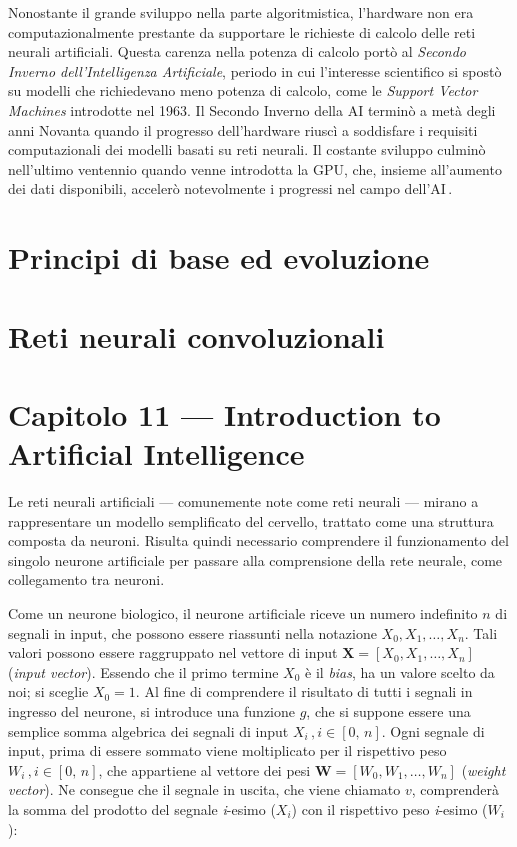 Nonostante il grande sviluppo nella parte algoritmistica, l'hardware non era computazionalmente prestante da supportare le richieste di calcolo delle reti neurali artificiali. Questa carenza nella potenza di calcolo portò al \textsl{Secondo Inverno dell'Intelligenza Artificiale}, periodo in cui l'interesse scientifico si spostò su modelli che richiedevano meno potenza di calcolo, come le \textit{Support Vector Machines} introdotte nel 1963. Il Secondo Inverno della \ac{AI} terminò a metà degli anni Novanta quando il progresso dell'hardware riuscì a soddisfare i requisiti computazionali dei modelli basati su reti neurali. Il costante sviluppo culminò nell'ultimo ventennio quando venne introdotta la GPU, che, insieme all'aumento dei dati disponibili, accelerò notevolmente i progressi nel campo dell'\ac{AI}\,\cite{flasinski2016introduction, muthukrishnan2020brief}.

\section{Principi di base ed evoluzione}
%







\section{Reti neurali convoluzionali}
% 


\section*{Capitolo 11 — Introduction to Artificial Intelligence}

Le reti neurali artificiali — comunemente note come reti neurali — mirano a rappresentare un modello semplificato del cervello, trattato come una struttura composta da neuroni. Risulta quindi necessario comprendere il funzionamento del singolo neurone artificiale per passare alla comprensione della rete neurale, come collegamento tra neuroni.

Come un neurone biologico, il neurone artificiale riceve un numero indefinito $n$ di segnali in input, che possono essere riassunti nella notazione $X_0, X_1, \dots, X_n$. Tali valori possono essere raggruppato nel vettore di input $\mathbf{X} = \left[X_0, X_1, \dots, X_n\right]$ (\textit{input vector}). Essendo che il primo termine $X_0$ è il \textit{bias}, ha un valore scelto da noi; si sceglie $X_0 = 1$. Al fine di comprendere il risultato di tutti i segnali in ingresso del neurone, si introduce una funzione $g$, che si suppone essere una semplice somma algebrica dei segnali di input $X_i\,,i\in[0,\,n]$. Ogni segnale di input, prima di essere sommato viene moltiplicato per il rispettivo peso $W_i\,,i\in[0,\,n]$, che appartiene al vettore dei pesi $\mathbf{W} = \left[W_0, W_1, \dots, W_n \right]$ (\textit{weight vector}). Ne consegue che il segnale in uscita, che viene chiamato $v$, comprenderà la somma del prodotto del segnale \textit{i}-esimo ($X_i$) con il rispettivo peso \textit{i}-esimo ($W_i$):

